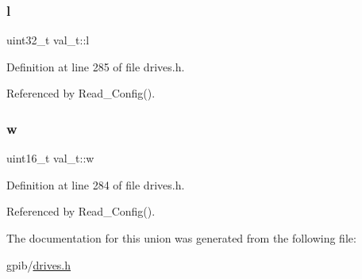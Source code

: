 \subsubsection{\texorpdfstring{l}{l}}
{\footnotesize\ttfamily uint32\+\_\+t val\+\_\+t\+::l}



Definition at line 285 of file drives.\+h.



Referenced by Read\+\_\+\+Config().

\mbox{\label{unionval__t_a35ceb0f111824a2835370671131c38c0}} 
\subsubsection{\texorpdfstring{w}{w}}
{\footnotesize\ttfamily uint16\+\_\+t val\+\_\+t\+::w}



Definition at line 284 of file drives.\+h.



Referenced by Read\+\_\+\+Config().



The documentation for this union was generated from the following file\+:\begin{DoxyCompactItemize}
\item 
gpib/\hyperlink{drives_8h}{drives.\+h}\end{DoxyCompactItemize}
